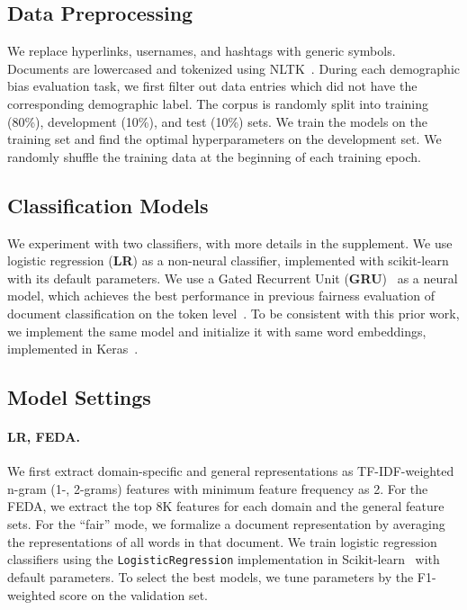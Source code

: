 \subsection{Data Preprocessing}
We replace hyperlinks, usernames, and hashtags with generic symbols. Documents are lowercased and tokenized using NLTK~\cite{bird2004nltk}. 
During each demographic bias evaluation task, we first filter out data entries which did not have the corresponding demographic label.
The corpus is randomly split into training (80\%), development (10\%), and test (10\%) sets. 
We train the models on the training set and find the optimal hyperparameters on the development set. 
We randomly shuffle the training data at the beginning of each training epoch. 


\subsection{Classification Models}

We experiment with two classifiers, with more details in the supplement.
We use logistic regression (\textbf{LR}) as a non-neural classifier,
implemented with scikit-learn~\cite{pedregosa2011scikit} with its default parameters.
We use a Gated Recurrent Unit (\textbf{GRU})~\cite{chung2014empirical} as a neural model, which achieves the best performance in previous fairness evaluation of document classification on the token level~\cite{park2018reducing}. 
To be consistent with this prior work, we implement the same model and initialize it with same word embeddings, implemented in Keras~\cite{chollet2015keras}.

\subsection{Model Settings}

\paragraph{LR, FEDA.} We first extract domain-specific and general representations as TF-IDF-weighted n-gram (1-, 2-grams) features with minimum feature frequency as 2. For the FEDA, we extract the top 8K features for each domain and the general feature sets.
For the ``fair'' mode, we formalize a document representation by averaging the representations of all words in that document.
We train logistic regression classifiers using the \texttt{LogisticRegression} implementation in Scikit-learn~\cite{pedregosa2011scikit} with default parameters.
To select the best models, we tune parameters by the F1-weighted score on the validation set.

